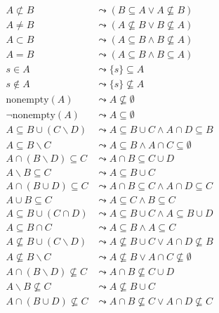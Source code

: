 \documentclass{article}
\begin{document}
\begin{figure}[htbp]
\begin{center}
\begin{align*}
A \not\subset B &\leadsto (B \subseteq A \lor A \not\subseteq B) \\
A \not= B       &\leadsto (A \not\subseteq B \lor B \not\subseteq A) \\
A \subset B     &\leadsto (A \subseteq B \land B \not\subseteq A) \\
A = B           &\leadsto (A \subseteq B \land B \subseteq A) \\
s \in A         &\leadsto \{ s \} \subseteq A \\
s \not\in A     &\leadsto \{ s \} \not\subseteq A \\
\text{nonempty}(A)          &\leadsto A \not\subseteq \emptyset \\
\lnot \text{nonempty}(A)    &\leadsto A \subseteq \emptyset \\
A \subseteq B \cup (C \backslash D)
    &\leadsto A \subseteq B \cup C \land A \cap D \subseteq B \\
A \subseteq B \backslash C
    &\leadsto A \subseteq B \land A \cap C \subseteq \emptyset \\
A \cap (B \backslash D) \subseteq C
    &\leadsto A \cap B \subseteq C \cup D \\
A \backslash B \subseteq C
    &\leadsto A \subseteq B \cup C \\
A \cap (B \cup D) \subseteq C
    & \leadsto A \cap B \subseteq C \land A \cap D \subseteq C \\
A \cup B \subseteq C
    & \leadsto A \subseteq C \land B \subseteq C \\
A \subseteq B \cup (C \cap D)
    & \leadsto A \subseteq B \cup C \land A \subseteq B \cup D \\
A \subseteq B \cap C
    & \leadsto A \subseteq B \land A \subseteq C \\
A \not\subseteq B \cup (C \backslash D)
    &\leadsto A \not\subseteq B \cup C \lor A \cap D \not\subseteq B \\
A \not\subseteq B \backslash C
    &\leadsto A \not\subseteq B \lor A \cap C \not\subseteq \emptyset \\
A \cap (B \backslash D) \not\subseteq C
    &\leadsto A \cap B \not\subseteq C \cup D \\
A \backslash B \not\subseteq C
    &\leadsto A \not\subseteq B \cup C \\
A \cap (B \cup D) \not\subseteq C
    & \leadsto A \cap B \not\subseteq C \lor A \cap D \not\subseteq C \\

\end{align*}
\end{center}
\end{figure}
\end{document}
